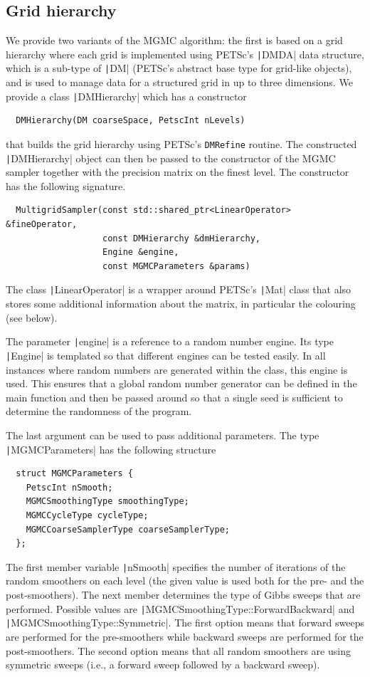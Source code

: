 \documentclass[
fontsize=11pt,
paper=a4,
numbers=noenddot
]{scrartcl}
\begin{document}
\subsection{Grid hierarchy}
We provide two variants of the MGMC algorithm: the first is based on a grid hierarchy where each grid is implemented using PETSc's \texttt|DMDA| data structure, which is a sub-type of \texttt|DM| (PETSc's abstract base type for grid-like objects), and is used to manage data for a structured grid in up to three dimensions. We provide a class \texttt|DMHierarchy| which has a constructor
\begin{verbatim}
  DMHierarchy(DM coarseSpace, PetscInt nLevels)
\end{verbatim}
that builds the grid hierarchy using PETSc's \texttt{DMRefine} routine. The constructed \texttt|DMHierarchy| object can then be passed to the constructor of the MGMC sampler together with the precision matrix on the finest level. The constructor has the following signature.
\begin{verbatim}
  MultigridSampler(const std::shared_ptr<LinearOperator> &fineOperator,
                   const DMHierarchy &dmHierarchy,
                   Engine &engine,
                   const MGMCParameters &params)
\end{verbatim}
The class \texttt|LinearOperator| is a wrapper around PETSc's \texttt|Mat| class that also stores some additional information about the matrix, in particular the colouring (see below).

The parameter \texttt|engine| is a reference to a random number engine. Its type \texttt|Engine| is templated so that different engines can be tested easily. In all instances where random numbers are generated within the class, this engine is used. This ensures that a global random number generator can be defined in the main function and then be passed around so that a single seed is sufficient to determine the randomness of the program.

The last argument can be used to pass additional parameters. The type \texttt|MGMCParameters| has the following structure
\begin{verbatim}
  struct MGMCParameters {
    PetscInt nSmooth;
    MGMCSmoothingType smoothingType;
    MGMCCycleType cycleType;
    MGMCCoarseSamplerType coarseSamplerType;
  };
\end{verbatim}
The first member variable \texttt|nSmooth| specifies the number of iterations of the random smoothers on each level (the given value is used both for the pre- and the post-smoothers). The next member determines the type of Gibbs sweeps that are performed. Possible values are \texttt|MGMCSmoothingType::ForwardBackward| and \texttt|MGMCSmoothingType::Symmetric|. The first option means that forward sweeps are performed for the pre-smoothers while backward sweeps are performed for the post-smoothers. The second option means that all random smoothers are using symmetric sweeps (i.e., a forward sweep followed by a backward sweep). 
\end{document}
